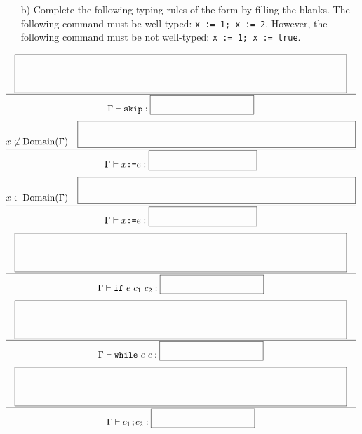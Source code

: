 \begin{enumerate}
\begin{itemize}
\item[b)] Complete the following typing rules
of the form 
by filling the blanks.
The following command must be well-typed: \verb+x := 1; x := 2+.
However, the following command must be not well-typed: \verb+x := 1; x := true+.
\end{itemize}

{
\[
\newinfrule
{ \lblank }
{ \typed{\code{skip}}{\sblank} }
\]
\[
\newinfrule
{ x\not\in\Dom{\Gamma} \rulesep \mblank }
{ \typed{x\code{:=}e}{\sblank} }
\]
\[
\newinfrule
{ x\in\Dom{\Gamma} \rulesep \mblank }
{ \typed{x\code{:=}e}{\sblank} }
\]
\[
\newinfrule
{ \lblank }
{ \typed{\code{if}\ e\ c_1\ c_2}{\sblank} }
\]
\[
\newinfrule
{ \lblank }
{ \typed{\code{while}\ e\ c}{\sblank} }
\]
\[
\newinfrule
{ \lblank }
{ \typed{c_1\code{;}c_2}{\sblank} }
\]
}

\end{enumerate}

